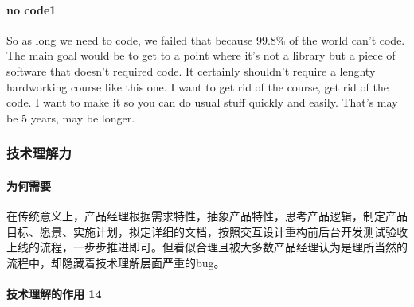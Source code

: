 \documentclass[letterpaper,10pt,english]{sphinxmanual}
\begin{document}
\paragraph{no code1\sphinxfootnotemark[425]}
\label{\detokenize{chapter_idea/goal:no-code1}}%
\begin{footnotetext}[425]\sphinxAtStartFootnote
{}
%
\end{footnotetext}\ignorespaces 
So as long we need to code, we failed that because 99.8\% of the world
can’t code. The main goal would be to get to a point where it’s not a
library but a piece of software that doesn’t required code. It certainly
shouldn’t require a lenghty hardworking course like this one. I want to
get rid of the course, get rid of the code. I want to make it so you can
do usual stuff quickly and easily. That’s may be 5 years, may be longer.


\subsubsection{技术理解力}
\label{\detokenize{chapter_idea/understand_tech:id1}}\label{\detokenize{chapter_idea/understand_tech::doc}}

\paragraph{为何需要}
\label{\detokenize{chapter_idea/understand_tech:id2}}
在传统意义上，产品经理根据需求特性，抽象产品特性，思考产品逻辑，制定产品目标、愿景、实施计划，拟定详细的文档，按照交互\sphinxhyphen{}设计\sphinxhyphen{}重构\sphinxhyphen{}前后台开发\sphinxhyphen{}测试验收上线的流程，一步步推进即可。但看似合理且被大多数产品经理认为是理所当然的流程中，却隐藏着技术理解层面严重的bug。


\paragraph{技术理解的作用 14\sphinxfootnotemark[426]}
\label{\detokenize{chapter_idea/understand_tech:id3}}%
\begin{footnotetext}[426]\sphinxAtStartFootnote
{}
%
\end{footnotetext}\ignorespaces 
\end{document}
